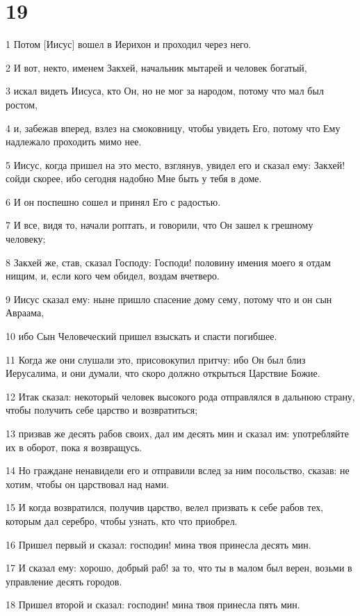 \chapter{19}

\par 1 Потом [Иисус] вошел в Иерихон и проходил через него.
\par 2 И вот, некто, именем Закхей, начальник мытарей и человек богатый,
\par 3 искал видеть Иисуса, кто Он, но не мог за народом, потому что мал был ростом,
\par 4 и, забежав вперед, взлез на смоковницу, чтобы увидеть Его, потому что Ему надлежало проходить мимо нее.
\par 5 Иисус, когда пришел на это место, взглянув, увидел его и сказал ему: Закхей! сойди скорее, ибо сегодня надобно Мне быть у тебя в доме.
\par 6 И он поспешно сошел и принял Его с радостью.
\par 7 И все, видя то, начали роптать, и говорили, что Он зашел к грешному человеку;
\par 8 Закхей же, став, сказал Господу: Господи! половину имения моего я отдам нищим, и, если кого чем обидел, воздам вчетверо.
\par 9 Иисус сказал ему: ныне пришло спасение дому сему, потому что и он сын Авраама,
\par 10 ибо Сын Человеческий пришел взыскать и спасти погибшее.
\par 11 Когда же они слушали это, присовокупил притчу: ибо Он был близ Иерусалима, и они думали, что скоро должно открыться Царствие Божие.
\par 12 Итак сказал: некоторый человек высокого рода отправлялся в дальнюю страну, чтобы получить себе царство и возвратиться;
\par 13 призвав же десять рабов своих, дал им десять мин и сказал им: употребляйте их в оборот, пока я возвращусь.
\par 14 Но граждане ненавидели его и отправили вслед за ним посольство, сказав: не хотим, чтобы он царствовал над нами.
\par 15 И когда возвратился, получив царство, велел призвать к себе рабов тех, которым дал серебро, чтобы узнать, кто что приобрел.
\par 16 Пришел первый и сказал: господин! мина твоя принесла десять мин.
\par 17 И сказал ему: хорошо, добрый раб! за то, что ты в малом был верен, возьми в управление десять городов.
\par 18 Пришел второй и сказал: господин! мина твоя принесла пять мин.
